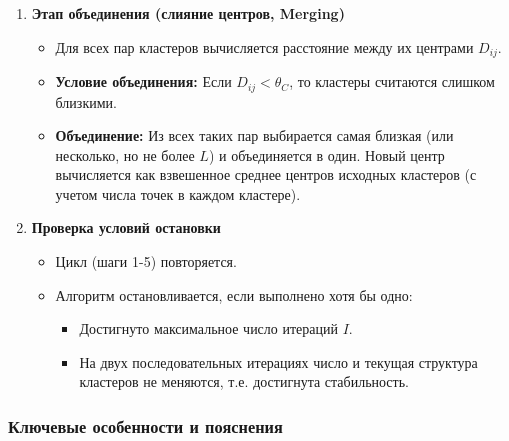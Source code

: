 \documentclass[11pt]{article}
\begin{document}
\begin{enumerate}
    \item \textbf{Этап объединения (слияние центров, Merging)}
    \begin{itemize}
        \item Для всех пар кластеров вычисляется расстояние между их центрами $D_{ij}$.
        \item \textbf{Условие объединения:} Если $D_{ij} < \theta_C$, то кластеры считаются слишком близкими.
        \item \textbf{Объединение:} Из всех таких пар выбирается самая близкая (или несколько, но не более $L$) и объединяется в один. Новый центр вычисляется как взвешенное среднее центров исходных кластеров (с учетом числа точек в каждом кластере).
    \end{itemize}
    
    \item \textbf{Проверка условий остановки}
    \begin{itemize}
        \item Цикл (шаги 1-5) повторяется.
        \item Алгоритм остановливается, если выполнено хотя бы одно:
        \begin{itemize}
            \item Достигнуто максимальное число итераций $I$.
            \item На двух последовательных итерациях число и текущая структура кластеров не меняются, т.е. достигнута стабильность.
        \end{itemize}
    \end{itemize}
\end{enumerate}

\subsubsection{Ключевые особенности и пояснения}
\end{document}
